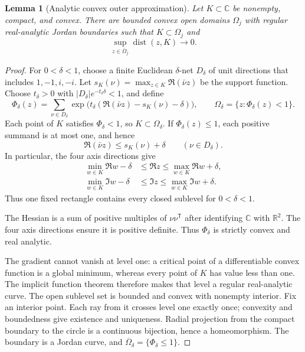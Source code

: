 \documentclass[11pt]{article}
\newcommand{\C}{\mathbb C}
\DeclareMathOperator{\dist}{dist}
\newtheorem{lemma}[theorem]{Lemma}
\theoremstyle{remark}\newtheorem{remark}[theorem]{Remark}
\numberwithin{equation}{section}
\begin{document}
\begin{lemma}[Analytic convex outer approximation]\label{lem:approx}
Let $K\subset\C$ be nonempty, compact, and convex. There are bounded convex open domains $\Omega_j$ with regular real-analytic Jordan boundaries such that $K\subset\Omega_j$ and
\[
 \sup_{z\in\overline\Omega_j}\dist(z,K)\longrightarrow0.
\]
\end{lemma}
\begin{proof}
For $0<\delta<1$, choose a finite Euclidean $\delta$-net $D_\delta$ of unit directions that includes $1,-1,i,-i$. Let $s_K(\nu)=\max_{z\in K}\Re(\bar\nu z)$ be the support function. Choose $t_\delta>0$ with $|D_\delta|e^{-t_\delta\delta}<1$, and define
\[
 \Phi_\delta(z)=\sum_{\nu\in D_\delta}
 \exp\bigl(t_\delta(\Re(\bar\nu z)-s_K(\nu)-\delta)\bigr),
 \qquad \Omega_\delta=\{z:\Phi_\delta(z)<1\}.
\]
Each point of $K$ satisfies $\Phi_\delta<1$, so $K\subset\Omega_\delta$.
If $\Phi_\delta(z)\le1$, each positive summand is at most one, and hence
\[
 \Re(\bar\nu z)\le s_K(\nu)+\delta\qquad(\nu\in D_\delta).
\]
In particular, the four axis directions give
\[
 \begin{aligned}
 \min_{w\in K}\Re w-\delta&\le\Re z\le\max_{w\in K}\Re w+\delta,\\
 \min_{w\in K}\Im w-\delta&\le\Im z\le\max_{w\in K}\Im w+\delta.
 \end{aligned}
\]
Thus one fixed rectangle contains every closed sublevel for $0<\delta<1$.

The Hessian is a sum of positive multiples of $\nu\nu^{\mathsf T}$ after identifying $\C$ with $\mathbb R^2$. The four axis directions ensure it is positive definite. Thus $\Phi_\delta$ is strictly convex and real analytic.

The gradient cannot vanish at level one: a critical point of a differentiable convex function is a global minimum, whereas every point of $K$ has value less than one. The implicit function theorem therefore makes that level a regular real-analytic curve. The open sublevel set is bounded and convex with nonempty interior. Fix an interior point. Each ray from it crosses level one exactly once; convexity and boundedness give existence and uniqueness. Radial projection from the compact boundary to the circle is a continuous bijection, hence a homeomorphism. The boundary is a Jordan curve, and $\overline\Omega_\delta=\{\Phi_\delta\le1\}$.


\end{proof}
\end{document}
